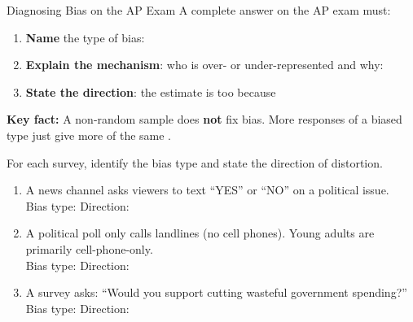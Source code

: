 \documentclass[10pt]{article}
\begin{document}
\begin{notesbox}{Diagnosing Bias on the AP Exam}
\small
A complete answer on the AP exam must:
\begin{enumerate}[itemsep=4pt]
  \item \textbf{Name} the type of bias: \blank{7cm}
  \item \textbf{Explain the mechanism}: who is over- or under-represented and why:
        \blank{7cm}
  \item \textbf{State the direction}: the estimate is too \blank{2cm} because
        \blank{5cm}
\end{enumerate}

\vspace{8pt}
\textbf{Key fact:} A \blank{2cm} non-random sample does \textbf{not} fix bias.
More responses of a biased type just give more of the same \blank{3cm}.
\end{notesbox}

\vspace{0.1in}

\begin{practicebox}
\small For each survey, identify the bias type and state the direction of distortion.
\begin{enumerate}[leftmargin=1.5em, itemsep=10pt]
  \item A news channel asks viewers to text ``YES'' or ``NO'' on a political issue.\\
        Bias type: \blank{5cm} \quad Direction: \blank{6cm}

  \item A political poll only calls landlines (no cell phones). Young adults are
        primarily cell-phone-only.\\
        Bias type: \blank{5cm} \quad Direction: \blank{6cm}

  \item A survey asks: ``Would you support cutting wasteful government spending?''\\
        Bias type: \blank{5cm} \quad Direction: \blank{6cm}
\end{enumerate}
\end{practicebox}
\end{document}
